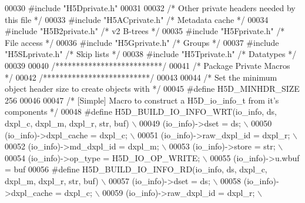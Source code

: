 \begin{DoxyCode}
00030 \textcolor{preprocessor}{#include "H5Dprivate.h"}
00031 
00032 \textcolor{comment}{/* Other private headers needed by this file */}
00033 \textcolor{preprocessor}{#include "H5ACprivate.h"}    \textcolor{comment}{/* Metadata cache           */}
00034 \textcolor{preprocessor}{#include "H5B2private.h"}        \textcolor{comment}{/* v2 B-trees                           */}
00035 \textcolor{preprocessor}{#include "H5Fprivate.h"}     \textcolor{comment}{/* File access              */}
00036 \textcolor{preprocessor}{#include "H5Gprivate.h"}     \textcolor{comment}{/* Groups               */}
00037 \textcolor{preprocessor}{#include "H5SLprivate.h"}    \textcolor{comment}{/* Skip lists               */}
00038 \textcolor{preprocessor}{#include "H5Tprivate.h"}     \textcolor{comment}{/* Datatypes                    */}
00039 
00040 \textcolor{comment}{/**************************/}
00041 \textcolor{comment}{/* Package Private Macros */}
00042 \textcolor{comment}{/**************************/}
00043 
00044 \textcolor{comment}{/* Set the minimum object header size to create objects with */}
00045 \textcolor{preprocessor}{#define H5D\_MINHDR\_SIZE 256}
00046 
00047 \textcolor{comment}{/* [Simple] Macro to construct a H5D\_io\_info\_t from it's components */}
00048 \textcolor{preprocessor}{#define H5D\_BUILD\_IO\_INFO\_WRT(io\_info, ds, dxpl\_c, dxpl\_m, dxpl\_r, str, buf)    \(\backslash\)}
00049 \textcolor{preprocessor}{    (io\_info)->dset = ds;                                               \(\backslash\)}
00050 \textcolor{preprocessor}{    (io\_info)->dxpl\_cache = dxpl\_c;                                     \(\backslash\)}
00051 \textcolor{preprocessor}{    (io\_info)->raw\_dxpl\_id = dxpl\_r;                                    \(\backslash\)}
00052 \textcolor{preprocessor}{    (io\_info)->md\_dxpl\_id = dxpl\_m;                                     \(\backslash\)}
00053 \textcolor{preprocessor}{    (io\_info)->store = str;                                             \(\backslash\)}
00054 \textcolor{preprocessor}{    (io\_info)->op\_type = H5D\_IO\_OP\_WRITE;                               \(\backslash\)}
00055 \textcolor{preprocessor}{    (io\_info)->u.wbuf = buf}
00056 \textcolor{preprocessor}{#define H5D\_BUILD\_IO\_INFO\_RD(io\_info, ds, dxpl\_c, dxpl\_m, dxpl\_r, str, buf) \(\backslash\)}
00057 \textcolor{preprocessor}{    (io\_info)->dset = ds;                                               \(\backslash\)}
00058 \textcolor{preprocessor}{    (io\_info)->dxpl\_cache = dxpl\_c;                                     \(\backslash\)}
00059 \textcolor{preprocessor}{    (io\_info)->raw\_dxpl\_id = dxpl\_r;                                    \(\backslash\)}

\end{DoxyCode}
